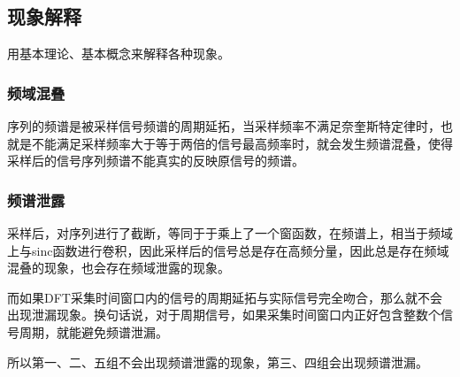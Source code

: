 \documentclass{../source/Experiment copy}
\begin{document}
        \subsection{现象解释}
        用基本理论、基本概念来解释各种现象。 

        \subsubsection{频域混叠}
        序列的频谱是被采样信号频谱的周期延拓，当采样频率不满足奈奎斯特定律时，也就是不能满足采样频率大于等于两倍的信号最高频率时，就会发生频谱混叠，使得采样后的信号序列频谱不能真实的反映原信号的频谱。

        \subsubsection{频谱泄露}

        采样后，对序列进行了截断，等同于于乘上了一个窗函数，在频谱上，相当于频域上与sinc函数进行卷积，因此采样后的信号总是存在高频分量，因此总是存在频域混叠的现象，也会存在频域泄露的现象。

        而如果DFT采集时间窗口内的信号的周期延拓与实际信号完全吻合，那么就不会出现泄漏现象。换句话说，对于周期信号，如果采集时间窗口内正好包含整数个信号周期，就能避免频谱泄漏。

        所以第一、二、五组不会出现频谱泄露的现象，第三、四组会出现频谱泄漏。
 
\end{document}
